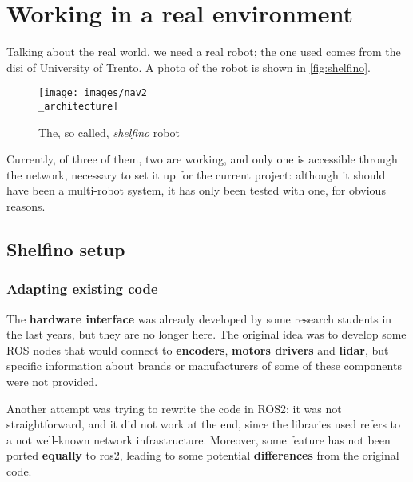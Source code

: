   

\chapter{Working in a real environment}
\label{cha:realworld}

Talking about the real world, we need a real robot; the one used comes from the \acrfull{disi} of University of Trento.
A photo of the robot is shown in \autoref{fig:shelfino}. %

\begin{figure}[h]
  \centering
  \texttt{[image: images/nav2\\\_architecture]}
  \caption{The, so called, \textit{shelfino} robot}
  \label{fig:shelfino}
\end{figure}

Currently, of three of them, two are working, and only one is accessible through the network, necessary to set it up for the current project: although it should have been a multi-robot system, it has only been tested with one, for obvious reasons.

\section{Shelfino setup} 

\subsection{Adapting existing code}

The \textbf{hardware interface} was already developed by some research students in the last years, but they are no longer here. The original idea was to develop some ROS nodes that would connect to \textbf{encoders}, \textbf{motors drivers} and \textbf{lidar}, but specific information about brands or manufacturers of some of these components were not provided.

Another attempt was trying to rewrite the code in ROS2: it was not straightforward, and it did not work at the end, since the libraries used refers to a not well-known network infrastructure. Moreover, some feature has not been ported \textbf{equally} to \acrshort{ros}2, leading to some potential \textbf{differences} from the original code.

